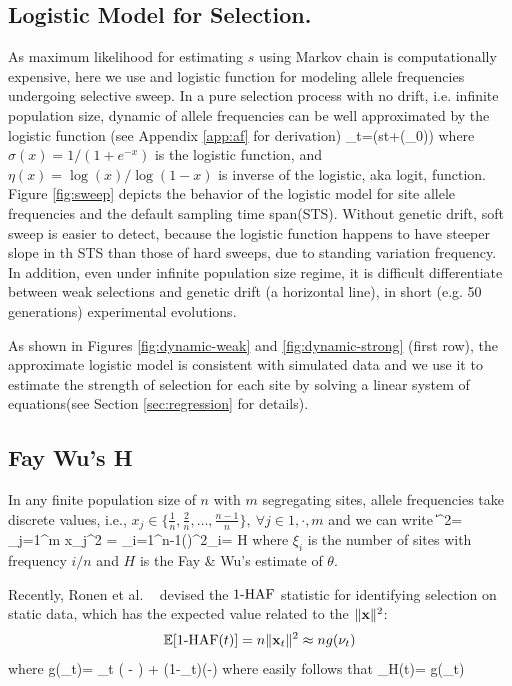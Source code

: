 \documentclass[11pt]{article}
\begin{document}
\subsection{Logistic Model for Selection.}
As maximum likelihood for estimating $s$ using Markov chain is computationally 
expensive, here we use and logistic function for modeling allele frequencies 
undergoing selective sweep.
In a pure selection process with no drift, i.e. infinite 
population size, 
dynamic of allele frequencies 
can be well approximated by the logistic function (see 
Appendix \ref{app:af} 
for 
derivation)
\beq
\nu_t=\sigma(st+\eta(\nu_0))\label{eq:nut}
\eeq
where $\sigma(x)=1/(1+e^{-x})$ is the logistic function, and 
$\eta(x)=\log(x)/\log(1-x)$ is inverse of the 
logistic, aka logit, function. Figure \ref{fig:sweep} depicts 
the behavior of 
the logistic model for site allele frequencies and the 
default sampling time 
span(STS). Without genetic drift, soft sweep is easier to 
detect, 
because the logistic function happens to have steeper slope 
in th STS than 
those of hard sweeps, due to standing variation frequency. In addition, even 
under infinite 
population size regime, it is 
difficult differentiate between weak selections and genetic 
drift (a horizontal 
line), in short (e.g. 50 generations) experimental evolutions.


As shown in Figures \ref{fig:dynamic-weak} and \ref{fig:dynamic-strong} (first 
row), the approximate logistic model is consistent with 
simulated data and we 
use it to estimate the strength of selection for 
each site by solving a linear system of equations(see Section 
\ref{sec:regression} for details).

\subsection{Fay Wu's H}\label{app:h}
\bl
In any finite population size of $n$ with $m$ segregating sites, 
allele frequencies take 
discrete values, i.e.,  $x_j \in 
\{\frac{1}{n},\frac{2}{n},\ldots,\frac{n-1}{n}\}, \ \forall j \in{1,\cdot,m}$ 
and we can write
\beq
\|\bfx\|^2= \sum_{j=1}^{m} x_j^2 = 
\sum_{i=1}^{n-1}\left(\right)^2\xi_i= 
H 
\eeq
where $\xi_i$ is the number of sites with frequency $i/n$ and $H$ is the 
Fay \& Wu's estimate of $\theta$.
\el

Recently, Ronen et al. ~\cite{ronen2015predicting} devised the $1\text{-HAF}$ 
statistic for identifying selection on static data, which has the expected 
value related to the $\|{\mathbf x}\|^2$:
\begin{equation} 
{\mathbb E}[1\text{-HAF}(t)]= n\| {\mathbf x}_t\|^2\approx ng(\nu_t)
\end{equation} 
where
\beq
g(\nu_t)= \theta \nu_t \left( - \right) +
\theta (1-\nu_t)\left(-\right)
\label{eq:hafscorepooled}
\eeq
where easily follows that
\beq
\theta_H(t)= g(\nu_t)
\eeq
\end{document}
